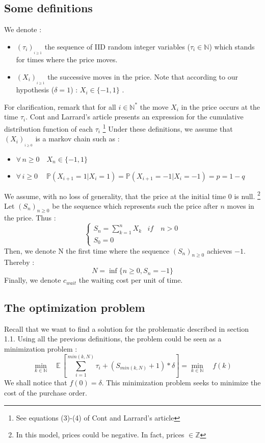 \documentclass{article}
\begin{document}
\subsection{Some definitions}
We denote :
\begin{itemize}
\item $(\tau_{i})_{_{i \geq 1}}$ the sequence of IID random integer variables  ($\tau_{i} \in \mathbb{N}$) which stands for times where the price moves.
\item $(X_{i})_{_{i \geq 1}}$ the successive moves in the price. Note that according to our hypothesis ($\delta = 1$) : $X_{i} \in \{-1,1\}$ .
\end{itemize}
For clarification, remark that for all $ i \in \mathbb{N^{*}} $ the move $X_{i}$ in the price occurs at the time $\tau_{i}$.\newline
Cont and Larrard's article presents an expression for the cumulative distribution function of each $\tau_{i}$ \footnote{See equations (3)-(4) of Cont and Larrard's article}
\newline
Under these definitions, we assume that $(X_{i})_{_{i \geq 0}}$ is a markov chain such as :
\begin{itemize}
\item $\forall \, n\geq0 \quad X_{n} \in \{-1,1\} $ 
\item $\forall \, i\geq0 \quad\ \mathbb{P}( X_{i+1}=1 | X_{i}=1 ) = \mathbb{P}( X_{i+1}=-1 | X_{i}=-1 ) = p = 1-q$
\end{itemize}
We assume, with no loss of generality, that the price at the initial time 0 is null. \footnote{In this model, prices could be negative. In fact, prices $\in \mathbb{Z}$}
Let $(S_{n})_{n\geq0}$ be the sequence which represents such the price after $n$ moves in the price. Thus :
\begin{equation*}
     \begin{cases}
        S_{n} = \sum_{k=1}^{n}X_{k} & if \quad n > 0 \\
        S_{0} = 0
     \end{cases}
\end{equation*}
Then, we denote N the first time where the sequence $(S_{n})_{n\geq0}$  achieves $-1$. Thereby :
$$ N= \inf \{ n\geq0 , S_{n}=-1   \} $$
Finally, we denote $c_{wait}$ the waiting cost per unit of time.


\subsection{The optimization problem}
Recall that we want to find a solution for the problematic described in section 1.1.
Using all the previous definitions, the problem could be seen as a minimization problem  :
\begin{equation}
\min\limits_{k \in \mathbb{N}} \quad \mathbb{E}\,\left[ \sum_{i=1}^{min(k,N)}\tau_{i} + (S_{min(k,N)}+1)*\delta\right] = \min\limits_{k \in \mathbb{N}} \quad f(k)
\end{equation}
We shall notice that $f(0) = \delta$. This minimization problem seeks to minimize the cost of the purchase order. 
\end{document}
